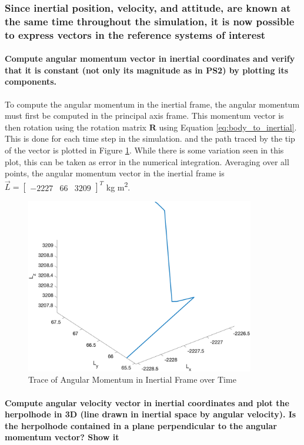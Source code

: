 \subsubsection{Since inertial position, velocity, and attitude, are known at the same time throughout the simulation, it is now possible to express vectors in the reference systems of interest}

\paragraph{Compute angular momentum vector in inertial coordinates and verify that it is constant (not only its magnitude as in PS2) by plotting its components.} To compute the angular momentum in the inertial frame, the angular momentum must first be computed in the principal axis frame. This momentum vector is then rotation using the rotation matrix $\boldsymbol{R}$ using Equation \ref{eq:body_to_inertial}. This is done for each time step in the simulation. and the path traced by the tip of the vector is plotted in Figure \ref{fig:angular_momentum_trace}. While there is some variation seen in this plot, this can be taken as error in the numerical integration. Averaging over all points, the angular momentum vector in the inertial frame is $\vec{L} = \begin{bmatrix} -2227 & 66 & 3209 \end{bmatrix}^T$ kg m\textsuperscript{2}. 

\begin{figure}[H]
    \centering
    \includegraphics[width = 10cm]{Images/angular_momentum_EA.png}
    \caption{Trace of Angular Momentum in Inertial Frame over Time}
    \label{fig:angular_momentum_trace}
\end{figure}

\paragraph{Compute angular velocity vector in inertial coordinates and plot the herpolhode in 3D (line drawn in inertial space by angular velocity). Is the herpolhode contained in a plane perpendicular to the angular momentum vector? Show it}

